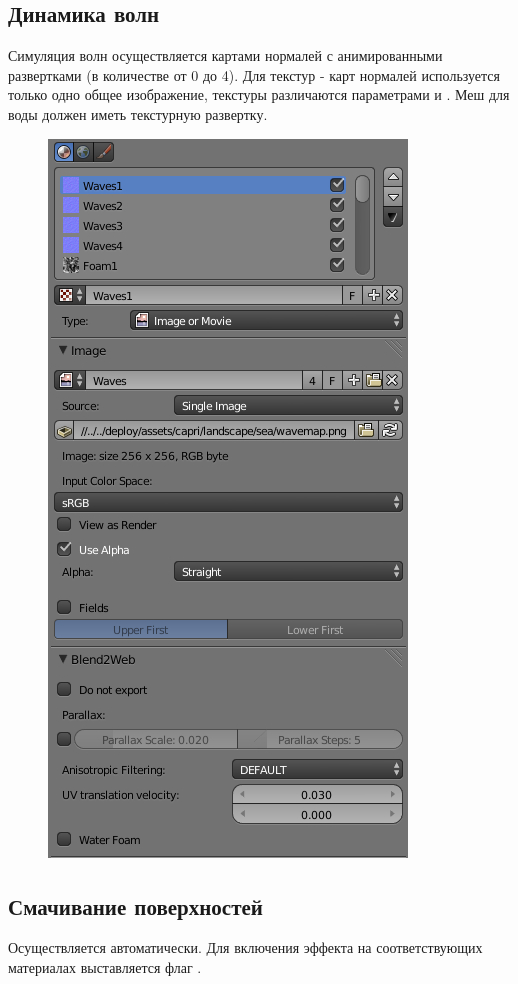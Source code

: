 \documentclass[a4paper,12pt,oneside]{sphinxmanual}
\begin{document}
\subsection{Динамика волн}
\label{outdoor_rendering:id5}
Симуляция волн осуществляется картами нормалей с анимированными развертками (в количестве от 0 до 4). Для текстур - карт нормалей используется только одно общее изображение, текстуры различаются параметрами  и . Меш для воды должен иметь текстурную развертку.
\begin{figure}[htbp]
\centering

\includegraphics[width=0.700\linewidth]{water_texture_setup_normal.jpg}
\end{figure}


\subsection{Смачивание поверхностей}
\label{outdoor_rendering:id6}
Осуществляется автоматически. Для включения эффекта на соответствующих материалах выставляется флаг .
\end{document}
